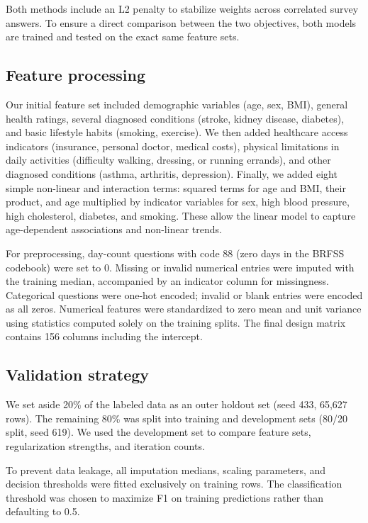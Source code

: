 \documentclass[10pt,conference,compsocconf]{latex-example-paper/IEEEtran}
\begin{document}
Both methods include an L2 penalty to stabilize weights across correlated survey answers. To ensure a direct comparison between the two objectives, both models are trained and tested on the exact same feature sets.

\subsection{Feature processing}
Our initial feature set included demographic variables (age, sex, BMI), general health ratings, several diagnosed conditions (stroke, kidney disease, diabetes), and basic lifestyle habits (smoking, exercise). We then added healthcare access indicators (insurance, personal doctor, medical costs), physical limitations in daily activities (difficulty walking, dressing, or running errands), and other diagnosed conditions (asthma, arthritis, depression). Finally, we added eight simple non-linear and interaction terms: squared terms for age and BMI, their product, and age multiplied by indicator variables for sex, high blood pressure, high cholesterol, diabetes, and smoking. These allow the linear model to capture age-dependent associations and non-linear trends.

For preprocessing, day-count questions with code 88 (zero days in the BRFSS codebook) were set to 0. Missing or invalid numerical entries were imputed with the training median, accompanied by an indicator column for missingness. Categorical questions were one-hot encoded; invalid or blank entries were encoded as all zeros. Numerical features were standardized to zero mean and unit variance using statistics computed solely on the training splits. The final design matrix contains 156 columns including the intercept.

\subsection{Validation strategy}
We set aside 20\% of the labeled data as an outer holdout set (seed 433, 65,627 rows). The remaining 80\% was split into training and development sets (80/20 split, seed 619). We used the development set to compare feature sets, regularization strengths, and iteration counts.

To prevent data leakage, all imputation medians, scaling parameters, and decision thresholds were fitted exclusively on training rows. The classification threshold was chosen to maximize F1 on training predictions rather than defaulting to 0.5.
\end{document}
